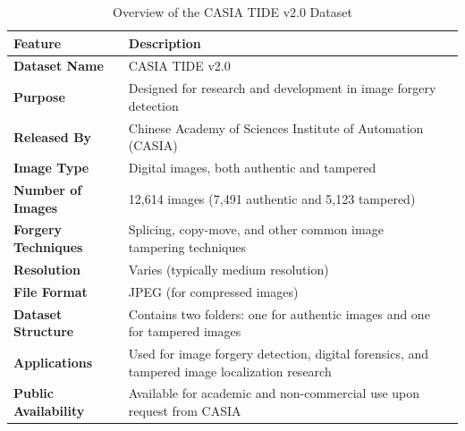 \documentclass{ieeeaccess}
\begin{document}
\begin{table}[h!]
	\centering
	\setlength{\tabcolsep}{3pt}
	\vspace{3mm}
	\begin{tabular}{|p{75pt}|p{150pt}|p{115pt}|}
		\hline
		\textbf{Feature}            & \textbf{Description}                                                                 \\ \hline
		\textbf{Dataset Name}       & CASIA TIDE v2.0                                                                      \\ \hline
		\textbf{Purpose}            & Designed for research and development in image forgery detection                     \\ \hline
		\textbf{Released By}        & Chinese Academy of Sciences Institute of Automation (CASIA)                          \\ \hline
		\textbf{Image Type}         & Digital images, both authentic and tampered                                          \\ \hline
		\textbf{Number of Images}   & 12,614 images (7,491 authentic and 5,123 tampered)                                   \\ \hline
		\textbf{Forgery Techniques} & Splicing, copy-move, and other common image tampering techniques                      \\ \hline
		\textbf{Resolution}         & Varies (typically medium resolution)                                                 \\ \hline
		\textbf{File Format}        & JPEG (for compressed images)                                                         \\ \hline
		\textbf{Dataset Structure}  & Contains two folders: one for authentic images and one for tampered images           \\ \hline
		\textbf{Applications}       & Used for image forgery detection, digital forensics, and tampered image localization research \\ \hline
		\textbf{Public Availability} & Available for academic and non-commercial use upon request from CASIA               \\ \hline
	\end{tabular}
	\caption{Overview of the CASIA TIDE v2.0 Dataset}
	\label{casiav2overview}
\end{table}
\end{document}
